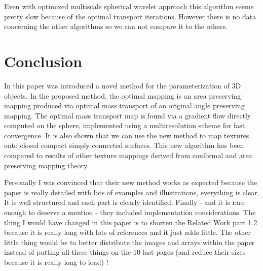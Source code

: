 \documentclass[11pt,a4paper]{article}
\begin{document}
\vskip 0.5cm
Even with optimized multiscale spherical wavelet approach this algorithm seems pretty slow because of the optimal transport iterations. However there is no data concerning the other algorithms so we can not compare it to the others. 

\section{Conclusion}

In this paper was introduced a novel method for the parameterization of 3D objects. 
In the proposed method, the optimal mapping is an area preserving mapping produced via optimal mass transport of an original angle preserving mapping. 
The optimal mass transport map is found via a gradient flow directly computed on the sphere, implemented using a multiresolution scheme
for fast convergence. 
It is also shown that we can use the new method to map textures onto closed compact simply connected surfaces.
This new algorithm has been compared to results of other texture mappings derived from conformal and area preserving mapping theory.

\vskip 0.5cm
Personally I was convinced that their new method works as expected because the paper is really detailed with lots of examples and illustrations, everything is clear.
It is well structured and each part is clearly identified. Finally - and it is rare enough to deserve a mention - they included implementation considerations.
The thing I would have changed in this paper is to shorten the Related Work part 1.2 because it is really long with lots of references and it just adds little. The other little thing would be to better distribute the images and arrays within the paper instead of putting all these things on the 10 last pages (and reduce their sizes because it is really long to load) !



\end{document}
